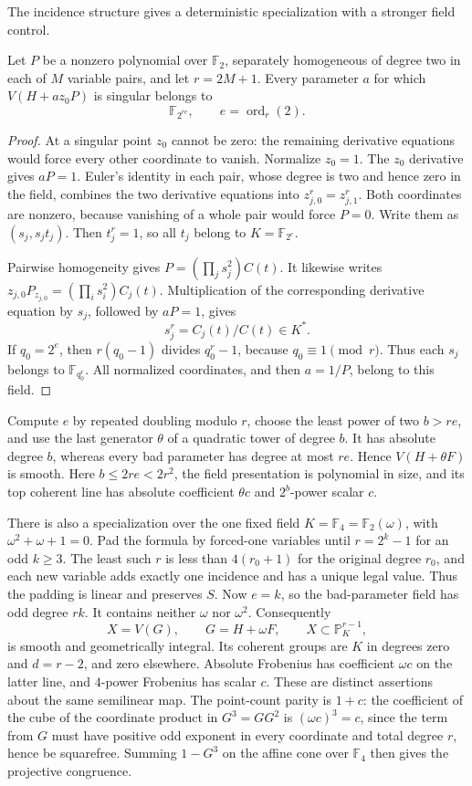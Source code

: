 The incidence structure gives a deterministic specialization with a stronger field control.
\begin{lemma}\label{lem:ff-bad-field}
Let $P$ be a nonzero polynomial over $\mathbb F_2$, separately homogeneous of degree two in each of $M$ variable pairs, and let $r=2M+1$. Every parameter $a$ for which $V(H+a z_0P)$ is singular belongs to
\[
 \mathbb F_{2^{r e}},\qquad e=\operatorname{ord}_r(2).
\]
\end{lemma}
\begin{proof}
At a singular point $z_0$ cannot be zero: the remaining derivative equations would force every other coordinate to vanish. Normalize $z_0=1$. The $z_0$ derivative gives $aP=1$. Euler's identity in each pair, whose degree is two and hence zero in the field, combines the two derivative equations into
$z_{j,0}^r=z_{j,1}^r$. Both coordinates are nonzero, because vanishing of a whole pair would force $P=0$. Write them as $(s_j,s_jt_j)$. Then $t_j^r=1$, so all $t_j$ belong to $K=\mathbb F_{2^e}$.

Pairwise homogeneity gives $P=(\prod_j s_j^2)C(t)$. It likewise writes $z_{j,0}P_{z_{j,0}}=(\prod_i s_i^2)C_j(t)$. Multiplication of the corresponding derivative equation by $s_j$, followed by $aP=1$, gives
\[
 s_j^r=C_j(t)/C(t)\in K^*.
\]
If $q_0=2^e$, then $r(q_0-1)$ divides $q_0^r-1$, because $q_0\equiv1\pmod r$. Thus each $s_j$ belongs to $\mathbb F_{q_0^r}$. All normalized coordinates, and then $a=1/P$, belong to this field.
\end{proof}

Compute $e$ by repeated doubling modulo $r$, choose the least power of two $b>re$, and use the last generator $\theta$ of a quadratic tower of degree $b$. It has absolute degree $b$, whereas every bad parameter has degree at most $re$. Hence $V(H+\theta F)$ is smooth. Here $b\leq2re<2r^2$, the field presentation is polynomial in size, and its top coherent line has absolute coefficient $\theta c$ and $2^b$-power scalar $c$.

There is also a specialization over the one fixed field $K=\mathbb F_4=\mathbb F_2(\omega)$, with $\omega^2+\omega+1=0$. Pad the formula by forced-one variables until $r=2^k-1$ for an odd $k\geq3$. The least such $r$ is less than $4(r_0+1)$ for the original degree $r_0$, and each new variable adds exactly one incidence and has a unique legal value. Thus the padding is linear and preserves $S$. Now $e=k$, so the bad-parameter field has odd degree $rk$. It contains neither $\omega$ nor $\omega^2$. Consequently
\[
 X=V(G),\qquad G=H+\omega F,
 \qquad X\subset\mathbb P_K^{r-1},
\]
is smooth and geometrically integral. Its coherent groups are $K$ in degrees zero and $d=r-2$, and zero elsewhere. Absolute Frobenius has coefficient $\omega c$ on the latter line, and $4$-power Frobenius has scalar $c$. These are distinct assertions about the same semilinear map. The point-count parity is $1+c$: the coefficient of the cube of the coordinate product in $G^3=GG^2$ is $(\omega c)^3=c$, since the term from $G$ must have positive odd exponent in every coordinate and total degree $r$, hence be squarefree. Summing $1-G^3$ on the affine cone over $\mathbb F_4$ then gives the projective congruence.

